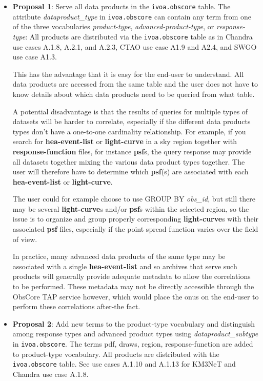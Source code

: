 \begin{itemize} 
\item {\bf Proposal 1}: Serve all data products in the {\tt ivoa.obscore} table.  The attribute {\em dataproduct\_type\/} in {\tt ivoa.obscore} can contain any term from one of the three vocabularies  \textsl{product-type}, \textsl{advanced-product-type},  or \textsl{response-type}: 
All products are distributed via the {\tt ivoa.obscore} table as in 
Chandra use cases A.1.8, A.2.1, and A.2.3, CTAO use case A1.9 and A2.4, and SWGO use case A1.3.

This has the advantage that it is easy for the end-user to understand.  All data products are accessed from the same table and the user does not have to know details about which data products need to be queried from what table.

A potential disadvantage is that the results of queries for multiple types of datasets will be harder to correlate, especially if the different data products types don't have a one-to-one cardinality relationship.  For example, if you search for  {\bf hea-event-list} or {\bf light-curve} in a sky region together with {\bf response-function} files, for instance {\bf psf}s, the query response may provide all datasets together mixing the various data product types together.  The user will therefore have to determine which {\bf psf}(s) are associated with each {\bf hea-event-list} or {\bf light-curve}.

The user could for example choose to use GROUP BY {\em obs\_id\/}, but still there may be several {\bf light-curve}s and/or {\bf psf}s within the selected region, so the issue is to organize and group properly corresponding {\bf light-curve}s with their associated {\bf psf} files, especially if the point spread function varies over the field of view.

In practice, many advanced data products of the same type may be associated with a single {\bf hea-event-list} and so archives that serve such products will generally provide adequate metadata to allow the correlations to be performed.  These metadata may not be directly accessible through the ObsCore TAP service however, which would place the onus on the end-user to perform these correlations after-the fact.

\item {\bf Proposal 2}: Add new terms to the product-type vocabulary and distinguish among response types and advanced product types using {\em dataproduct\_subtype\/} in {\tt ivoa.obscore}. 
The terms  pdf, draws, region, response-function are added to product-type vocabulary. 
All products are distributed with the {\tt ivoa.obscore} table.
See use cases A.1.10 and A.1.13 for KM3NeT and Chandra use case A.1.8.


\end{itemize}
